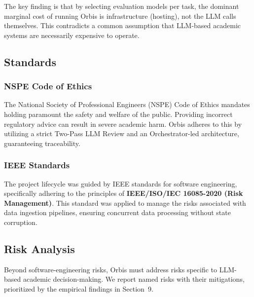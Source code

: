 \documentclass[a4paper,12pt]{article}
\begin{document}
The key finding is that by selecting evaluation models per task, the dominant marginal cost of running Orbis is infrastructure (hosting), not the LLM calls themselves. This contradicts a common assumption that LLM-based academic systems are necessarily expensive to operate.

\subsection{Standards}
\subsubsection{NSPE Code of Ethics}
The National Society of Professional Engineers (NSPE) Code of Ethics mandates holding paramount the safety and welfare of the public. Providing incorrect regulatory advice can result in severe academic harm. Orbis adheres to this by utilizing a strict Two-Pass LLM Review and an Orchestrator-led architecture, guaranteeing traceability.

\subsubsection{IEEE Standards}
The project lifecycle was guided by IEEE standards for software engineering, specifically adhering to the principles of \textbf{IEEE/ISO/IEC 16085-2020 (Risk Management)}. This standard was applied to manage the risks associated with data ingestion pipelines, ensuring concurrent data processing without state corruption.

\subsection{Risk Analysis}
Beyond software-engineering risks, Orbis must address risks specific to LLM-based academic decision-making. We report named risks with their mitigations, prioritized by the empirical findings in Section~9.
\end{document}
